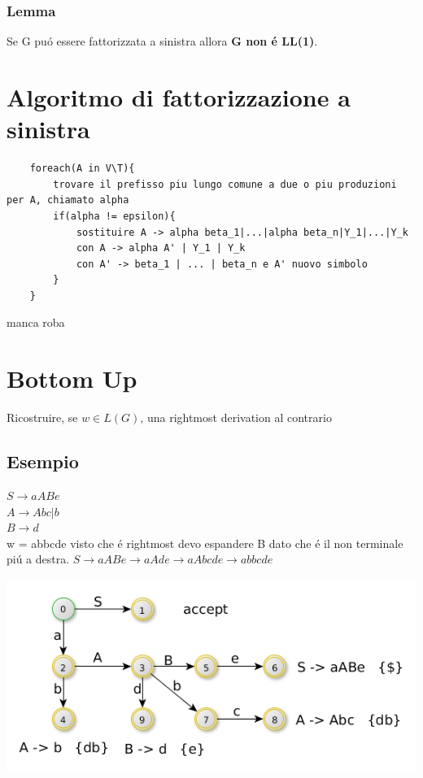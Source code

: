 \subsubsection{Lemma}
Se G pu\'o essere fattorizzata a sinistra allora \textbf{G non \'e LL(1)}.

\section{Algoritmo di fattorizzazione a sinistra}
\begin{lstlisting}
    foreach(A in V\T){
        trovare il prefisso piu lungo comune a due o piu produzioni per A, chiamato alpha 
        if(alpha != epsilon){
            sostituire A -> alpha beta_1|...|alpha beta_n|Y_1|...|Y_k
            con A -> alpha A' | Y_1 | Y_k 
            con A' -> beta_1 | ... | beta_n e A' nuovo simbolo
        }
    }
\end{lstlisting}

manca roba

\section{Bottom Up}
Ricostruire, se $w \in L(G)$, una rightmost derivation al contrario

\subsection{Esempio}
$S \rightarrow aABe$\\
$A \rightarrow Abc|b$\\
$B \rightarrow d$\\

w = abbcde visto che \'e rightmost devo espandere B dato che \'e il non terminale pi\'u a destra.
$S \rightarrow aABe \rightarrow aAde \rightarrow aAbcde \rightarrow abbcde $\\

\begin{center}
    \includegraphics[scale=0.6]{Chapters/Img/c02_14.png}\\
\end{center} 


